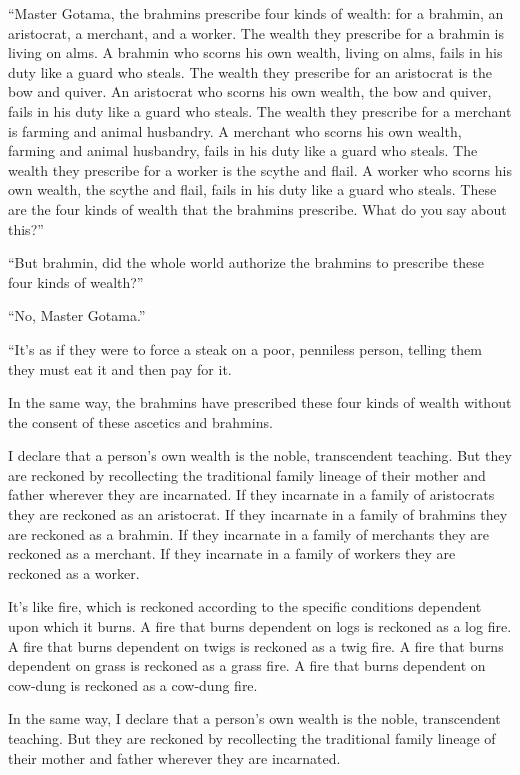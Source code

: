 \documentclass[12pt,openany]{book}%
\begin{document}
“Master Gotama, the brahmins prescribe four kinds of wealth: for a brahmin, an aristocrat, a merchant, and a worker. The wealth they prescribe for a brahmin is living on alms. A brahmin who scorns his own wealth, living on alms, fails in his duty like a guard who steals. The wealth they prescribe for an aristocrat is the bow and quiver. An aristocrat who scorns his own wealth, the bow and quiver, fails in his duty like a guard who steals. The wealth they prescribe for a merchant is farming and animal husbandry. A merchant who scorns his own wealth, farming and animal husbandry, fails in his duty like a guard who steals. The wealth they prescribe for a worker is the scythe and flail. A worker who scorns his own wealth, the scythe and flail, fails in his duty like a guard who steals. These are the four kinds of wealth that the brahmins prescribe. What do you say about this?” 

“But brahmin, did the whole world authorize the brahmins to prescribe these four kinds of wealth?” 

“No, Master Gotama.” 

“It’s as if they were to force a steak on a poor, penniless person, telling them they must eat it and then pay for it. 

In the same way, the brahmins have prescribed these four kinds of wealth without the consent of these ascetics and brahmins. 

I declare that a person’s own wealth is the noble, transcendent teaching. But they are reckoned by recollecting the traditional family lineage of their mother and father wherever they are incarnated. If they incarnate in a family of aristocrats they are reckoned as an aristocrat. If they incarnate in a family of brahmins they are reckoned as a brahmin. If they incarnate in a family of merchants they are reckoned as a merchant. If they incarnate in a family of workers they are reckoned as a worker. 

It’s like fire, which is reckoned according to the specific conditions dependent upon which it burns. A fire that burns dependent on logs is reckoned as a log fire. A fire that burns dependent on twigs is reckoned as a twig fire. A fire that burns dependent on grass is reckoned as a grass fire. A fire that burns dependent on cow-dung is reckoned as a cow-dung fire. 

In the same way, I declare that a person’s own wealth is the noble, transcendent teaching. But they are reckoned by recollecting the traditional family lineage of their mother and father wherever they are incarnated. 
\end{document}
